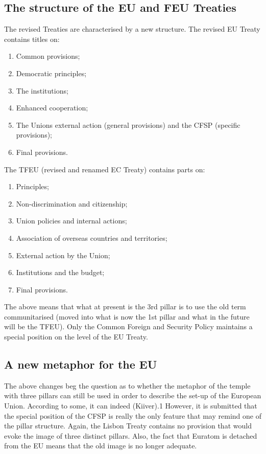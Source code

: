 \clearpage
\subsection{The structure of the EU and FEU Treaties}
The revised Treaties are characterised by a new structure.
The revised EU Treaty contains titles on:
\begin{enumerate}
\item Common provisions;
\item Democratic principles;
\item The institutions;
\item Enhanced cooperation;
\item The Unions external action (general provisions) and the CFSP (specific provisions);
\item Final provisions.
\end{enumerate}
The TFEU (revised and renamed EC Treaty) contains parts on:
\begin{enumerate}
\item Principles;
\item Non-discrimination and citizenship;
\item Union policies and internal actions;
\item Association of overseas countries and territories;
\item External action by the Union;
\item Institutions and the budget;
\item Final provisions.
\end{enumerate}

The above means that what at present is the 3rd pillar is to use the old term communitarised (\ie moved into what is now the 1st pillar and what in the future will be the TFEU). Only the Common Foreign and Security Policy maintains a special position on the level of the EU Treaty.

\clearpage
\subsection{A new metaphor for the EU}
The above changes beg the question as to whether the metaphor of the temple with three pillars can still be used in order to describe the set-up of the European Union. According to some, it can indeed (\eg Kiiver).1 However, it is submitted that the special position of the CFSP is really the only feature that may remind one of the pillar structure. Again, the Lisbon Treaty contains no provision that would evoke the image of three distinct pillars. Also, the fact that Euratom is detached from the EU means that the old image is no longer adequate.

